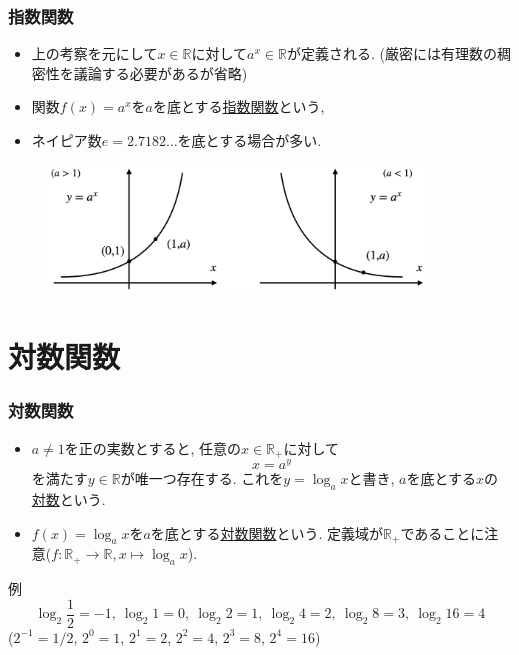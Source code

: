 \documentclass[dvipdfmx,cjk,10.2pt]{beamer}
\newcommand{\R}{\mathbb{R}}
\theoremstyle{definition}
\begin{document}
\begin{frame}
\frametitle{指数関数}

\begin{itemize}
\item 上の考察を元にして$x \in \R$に対して$a^x \in \R$が定義される. (厳密には有理数の稠密性を議論する必要があるが省略)
\item 関数$f(x)=a^x$を$a$を底とする\underline{指数関数}という, 
\item ネイピア数$e=2.7182\dots$を底とする場合が多い. 
\end{itemize}


\vspace{-1mm}

\begin{figure}[htbp]
 \begin{center} 
  \includegraphics[width=100mm]{exp.png}
 \end{center}
\end{figure}
\vspace{-4mm}


\end{frame}





\section{対数関数}

\begin{frame}
\frametitle{対数関数}   

\begin{itemize}
\item 
$a \ne 1$を正の実数とすると, 任意の$x \in \R_+$に対して
$$
x=a^y
$$
を満たす$y \in \R$が唯一つ存在する. これを$y=\log_a x$と書き, $a$を底とする$x$の\underline{対数}という. 
\item $f(x)=\log_a x$を$a$を底とする\underline{対数関数}という. 
定義域が$\R_+$であることに注意($f: \R_{+} \rightarrow \R, x \mapsto \log_a x$).   
\end{itemize}

例
$$
 \log_2 \frac{1}{2}=-1, \  \log_2 1=0, \ \log_2 2=1, \  \log_2 4=2, \  \log_2 8=3, \  \log_2 16=4
$$
($2^{-1}=1/2$, $2^{0}=1$, $2^{1}=2$, $2^{2}=4$, $2^{3}=8$, $2^{4}=16$)


\end{frame}
\end{document}
